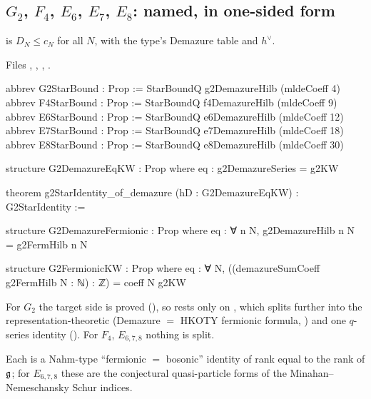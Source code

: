 \subsection{\texorpdfstring{$G_2$}{G2}, \texorpdfstring{$F_4$}{F4}, \texorpdfstring{$E_6$}{E6}, \texorpdfstring{$E_7$}{E7}, \texorpdfstring{$E_8$}{E8}: named, in one-sided form}

\begin{definition}\label{l25:def:starbounds}
 is $D_N\le c_N$ for all $N$, with the type's Demazure table and $h^\vee$.
\end{definition}
\noindent Files ,
, , .
\begin{leancode}
abbrev G2StarBound : Prop := StarBoundQ g2DemazureHilb (mldeCoeff 4)
abbrev F4StarBound : Prop := StarBoundQ f4DemazureHilb (mldeCoeff 9)
abbrev E6StarBound : Prop := StarBoundQ e6DemazureHilb (mldeCoeff 12)
abbrev E7StarBound : Prop := StarBoundQ e7DemazureHilb (mldeCoeff 18)
abbrev E8StarBound : Prop := StarBoundQ e8DemazureHilb (mldeCoeff 30)
\end{leancode}
\begin{leancode}
structure G2DemazureEqKW : Prop where
  eq : g2DemazureSeries = g2KW

theorem g2StarIdentity_of_demazure (hD : G2DemazureEqKW) : G2StarIdentity :=

structure G2DemazureFermionic : Prop where
  eq : ∀ n N, g2DemazureHilb n N = g2FermHilb n N

structure G2FermionicKW : Prop where
  eq : ∀ N, ((demazureSumCoeff g2FermHilb N : ℕ) : ℤ) = coeff N g2KW
\end{leancode}
\begin{dictionary}
For $G_2$ the target side is proved (), so  rests only on
, which splits further into the representation-theoretic  (Demazure
$=$ HKOTY fermionic formula, ) and one $q$-series identity 
(). For $F_4$, $E_{6,7,8}$ nothing is split.
\end{dictionary}
\begin{physics}
Each is a Nahm-type ``fermionic $=$ bosonic'' identity of rank equal to the rank of $\mathfrak g$; for $E_{6,7,8}$
these are the conjectural quasi-particle forms of the Minahan--Nemeschansky Schur indices.
\end{physics}
